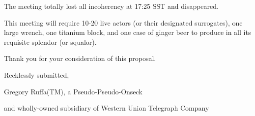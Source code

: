 \documentclass[12pt]{article}
\begin{document}
\vspace{12pt}

\noindent
The meeting totally lost all incoherency at 17:25 SST and disappeared.

\vspace{18pt}

This meeting will require 10-20 live actors (or their designated surrogates), one large wrench, one titanium block, and one case of ginger beer to produce in all its requisite splendor (or squalor).

Thank you for your consideration of this proposal.

\centerline{Recklessly submitted,}
\centerline{Gregory Ruffa(TM), a Pseudo-Pseudo-Onseck}
\centerline{and wholly-owned subsidiary of Western Union Telegraph Company}
\end{document}
